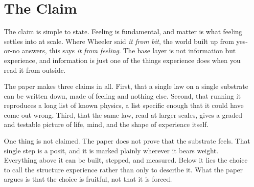 \section{The Claim}

The claim is simple to state. Feeling is fundamental, and matter is what feeling settles into at scale. Where Wheeler said \emph{it from bit}, the world built up from yes-or-no answers, this says \emph{it from feeling}. The base layer is not information but experience, and information is just one of the things experience does when you read it from outside.

The paper makes three claims in all. First, that a single law on a single substrate can be written down, made of feeling and nothing else. Second, that running it reproduces a long list of known physics, a list specific enough that it could have come out wrong. Third, that the same law, read at larger scales, gives a graded and testable picture of life, mind, and the shape of experience itself.

One thing is not claimed. The paper does not prove that the substrate feels. That single step is a posit, and it is marked plainly wherever it bears weight. Everything above it can be built, stepped, and measured. Below it lies the choice to call the structure experience rather than only to describe it. What the paper argues is that the choice is fruitful, not that it is forced.
